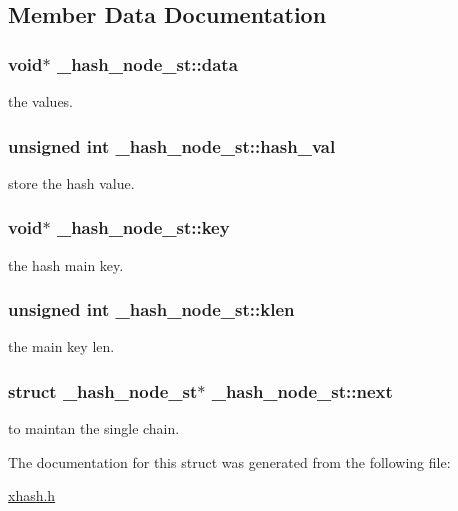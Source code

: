 \subsection{Member Data Documentation}
\hypertarget{struct__hash__node__st_aef60dd275e956b132b025fbb51707fe7}{
\subsubsection[{data}]{\setlength{\rightskip}{0pt plus 5cm}void$\ast$ \-\_\-hash\-\_\-node\-\_\-st\-::data}}\label{struct__hash__node__st_aef60dd275e956b132b025fbb51707fe7}
the values. \hypertarget{struct__hash__node__st_ae0765732bd23e72aa2168d90d117ddf2}{
\subsubsection[{hash\-\_\-val}]{\setlength{\rightskip}{0pt plus 5cm}unsigned int \-\_\-hash\-\_\-node\-\_\-st\-::hash\-\_\-val}}\label{struct__hash__node__st_ae0765732bd23e72aa2168d90d117ddf2}
store the hash value. \hypertarget{struct__hash__node__st_a0c6ce46fbc8b8aeb82ce7e999f6ca8ee}{
\subsubsection[{key}]{\setlength{\rightskip}{0pt plus 5cm}void$\ast$ \-\_\-hash\-\_\-node\-\_\-st\-::key}}\label{struct__hash__node__st_a0c6ce46fbc8b8aeb82ce7e999f6ca8ee}
the hash main key. \hypertarget{struct__hash__node__st_a1a3c1d7f708e607fedee3d83c2961a4f}{
\subsubsection[{klen}]{\setlength{\rightskip}{0pt plus 5cm}unsigned int \-\_\-hash\-\_\-node\-\_\-st\-::klen}}\label{struct__hash__node__st_a1a3c1d7f708e607fedee3d83c2961a4f}
the main key len. \hypertarget{struct__hash__node__st_a6bc5ff6e2160de48ebf6e3bba36becd3}{
\subsubsection[{next}]{\setlength{\rightskip}{0pt plus 5cm}struct {\bf \-\_\-hash\-\_\-node\-\_\-st}$\ast$ \-\_\-hash\-\_\-node\-\_\-st\-::next}}\label{struct__hash__node__st_a6bc5ff6e2160de48ebf6e3bba36becd3}
to maintan the single chain. 

The documentation for this struct was generated from the following file\-:\begin{DoxyCompactItemize}
\item 
\hyperlink{xhash_8h}{xhash.\-h}\end{DoxyCompactItemize}
